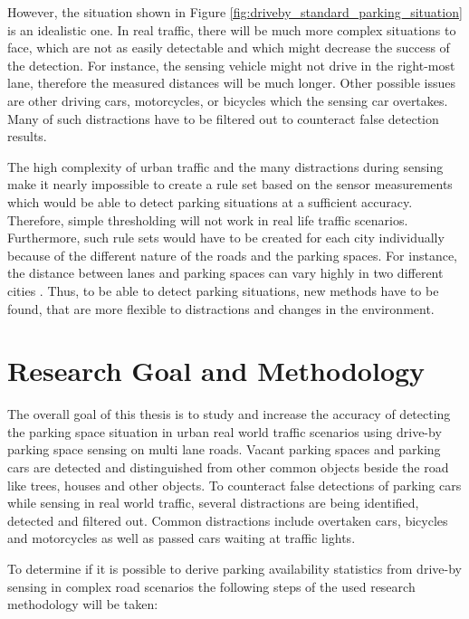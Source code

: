 However, the situation shown in Figure \ref{fig:driveby_standard_parking_situation} is an idealistic one. In real traffic, there will be much more complex situations to face, which are not as easily detectable and which might decrease the success of the detection. For instance, the sensing vehicle might not drive in the right-most lane, therefore the measured distances will be much longer. Other possible issues are other driving cars, motorcycles, or bicycles which the sensing car overtakes. Many of such distractions have to be filtered out to counteract false detection results.

The high complexity of urban traffic and the many distractions during sensing make it nearly impossible to create a rule set based on the sensor measurements which would be able to detect parking situations at a sufficient accuracy. Therefore, simple thresholding will not work in real life traffic scenarios. Furthermore, such rule sets would have to be created for each city individually because of the different nature of the roads and the parking spaces. For instance, the distance between lanes and parking spaces can vary highly in two different cities \cite{Grassi:2017:PIE:3132211.3134452}. Thus, to be able to detect parking situations, new methods have to be found, that are more flexible to distractions and changes in the environment.




\section{Research Goal and Methodology}

The overall goal of this thesis is to study and increase the accuracy of detecting the parking space situation in urban real world traffic scenarios using drive-by parking space sensing on multi lane roads. Vacant parking spaces and parking cars are detected and distinguished from other common objects beside the road like trees, houses and other objects. To counteract false detections of parking cars while sensing in real world traffic, several distractions are being identified, detected and filtered out. Common distractions include overtaken cars, bicycles and motorcycles as well as passed cars waiting at traffic lights.

To determine if it is possible to derive parking availability statistics from drive-by sensing in complex road scenarios the following steps of the used research methodology will be taken:


